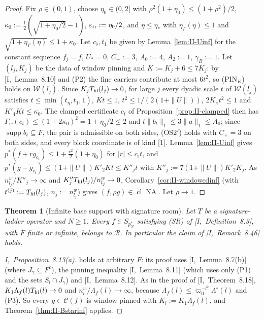 \documentclass[10pt]{amsart}
\newtheorem{theorem}{Theorem}[section]
\theoremstyle{definition}
\theoremstyle{remark}
\newcommand{\NA}{\operatorname{NA}}
\newcommand{\supp}{\operatorname{supp}}
\newcommand{\Cset}{\mathcal C}
\newcommand{\cl}{\operatorname{cl}}
\newcommand{\Rec}{\mathcal R}
\begin{document}
\begin{proof}
Fix $\rho\in(0,1)$, choose $\eta_0\in(0,2]$ with $\rho^2(1+\eta_0)\le
(1+\rho^2)/2$, $\kappa_0:=\frac12(\sqrt{1+\eta_0/2}-1)$, $\varepsilon_{\rm tr}:=
\eta_0/2$, and $\eta\le\eta_*$ with $\eta_\Gamma(\eta)\le1$ and
$\sqrt{1+\eta_\Gamma(\eta)}\le1+\kappa_0$.  Let $c_\flat,t_1$ be given by
Lemma~\ref{lem:II-Uinf} for the constant sequence $f_j=f$, $U_*=0$, $C_+:=3$,
$A_0:=4$, $A_2:=1$, $\gamma_B:=1$.  Let $(l_j,K_j)$ be the data of window
pinning and $K:=K_j+6\le7K_j$: by [I,~Lemma~8.10] and (P2) the fine carriers
contribute at most $6t^2$, so (PIN$_K$) holds on $\mathcal W(l_j)$.  Since
$K_jT_{\rm hi}(l_j)\to0$, for large $j$ every dyadic scale $t$ of $\mathcal
W(l_j)$ satisfies $t\le\min(t_\eta,t_1,1)$, $Kt\le1$, $t^2\le1/(2(1+\|U\|))$,
$2K_\kappa t^2\le1$ and $K'_4Kt\le\kappa_0$.  The clamped certificate $c_t$
of Proposition~\ref{prop:II-clamped} then has $\Gamma_w(c_t)\le(1+2\kappa_0)^2=
1+\eta_0/2\le2$ and $t\|b_t\|_1\le3\|a\|_1\le A_0$; since $\supp b_t\subseteq F$,
the pair is admissible on both sides, (OS2$'$) holds with $C_+=3$ on both sides,
and every block coordinate is of kind [1].  Lemma~\ref{lem:II-Uinf} gives
$p^*(f+rg_{c_t})\le1+\frac{r^2}2(1+\eta_0)$ for $|r|\le c_\flat t$, and
$p^*(g-g_{c_t})\le(1+\|U\|)K'_2Kt\le K''_jt$ with $K''_j:=7(1+\|U\|)K'_2K_j$.
As $n^w_{l_j}/K''_j\to\infty$ and $K''_jT_{\rm hi}(l_j)/n^w_{l_j}\to0$,
Corollary~\ref{cor:II-windowedinf} (with $t^{(j)}:=T_{\rm hi}(l_j)$,
$n_j:=n^w_{l_j}$) gives $(f,\rho g)\in\cl\NA$.  Let $\rho\to1$.
\end{proof}

\begin{theorem}[Infinite base support with signature room]\label{thm:II-Binf}
Let $T$ be a signature-ladder operator and $N\ge1$.  Every $f\in S_{p_N^*}$
satisfying \textup{(SR)} of [I,~Definition~8.3], with $F$ finite or
infinite, belongs to $\Rec$.  In particular the claim of
[I,~Remark~8.46] holds.
\end{theorem}

\begin{proof}
[I,~Proposition~8.13(a)] holds at arbitrary $F$: its proof uses
[I,~Lemma~8.7(b)] (where $J_\gamma\subseteq F^c$), the pinning inequality
[I,~Lemma~8.11] (which uses only (P1) and the sets $S_l\cap J_\gamma$) and
[I,~Lemma~8.12].  As in the proof of [I,~Theorem~8.18],
$K_1\Lambda_f(l)T_{\rm hi}(l)\to0$ and $n^w_l/\Lambda_f(l)\to\infty$, because
$\Lambda_f(l)\le\varpi_0^{-l^2}\Lambda^\circ(l)$ and (P3).  So every
$g\in\Cset(f)$ is window-pinned with $K_l:=K_1\Lambda_f(l)$, and
Theorem~\ref{thm:II-Bstarinf} applies.
\end{proof}
\end{document}
